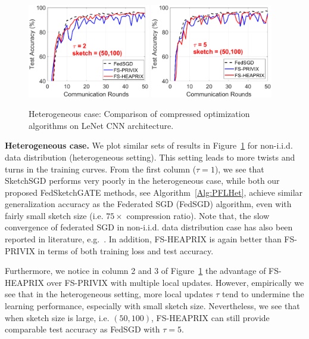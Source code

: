 \documentclass[twoside]{article}
\begin{document}
\begin{figure}[h]
\begin{center}
{		\includegraphics[width=2.1in]{MNIST_figures/local2_sketch50_iid0_test_acc.eps} \hspace{-0.2in}
		\includegraphics[width=2.1in]{MNIST_figures/local5_sketch50_iid0_test_acc.eps}
		}
	\end{center}
	\caption{Heterogeneous case: Comparison of compressed optimization algorithms on LeNet CNN architecture.}
    \label{fig:MNIST-iid0}
\end{figure}


\textbf{Heterogeneous case.} We plot similar sets of results in Figure~\ref{fig:MNIST-iid0} for non-i.i.d. data distribution (heterogeneous setting). This setting leads to more twists and turns in the training curves. 
From the first column ($\tau=1$), we see that SketchSGD performs very poorly in the heterogeneous case, while both our proposed FedSketchGATE methods, see Algorithm~\ref{Alg:PFLHet}, achieve similar generalization accuracy as the Federated SGD (FedSGD) algorithm, even with fairly small sketch size (i.e. $75\times$ compression ratio). Note that, the slow convergence of federated SGD in non-i.i.d. data distribution case has also been reported in literature, e.g.~\cite{mcmahan2016communication,chen2020toward}. In addition, FS-HEAPRIX is again better than FS-PRIVIX in terms of both training loss and test accuracy.

Furthermore, we notice in column 2 and 3 of Figure~\ref{fig:MNIST-iid0} the advantage of FS-HEAPRIX over FS-PRIVIX with multiple local updates. However, empirically we see that in the heterogeneous setting, more local updates $\tau$ tend to undermine the learning performance, especially with small sketch size.  Nevertheless, we see that when sketch size is large, i.e. $(50,100)$, FS-HEAPRIX can still provide comparable test accuracy as FedSGD with $\tau=5$.
\end{document}
